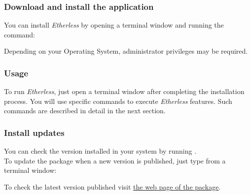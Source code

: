     \subsubsection{Download and install the application}
    You can install \textit{Etherless} by opening a terminal window and running the command:
     \begin{center}
     \end{center}
     Depending on your Operating System, administrator privileges may be required. \\
         \subsubsection{Usage}
      To run \textit{Etherless}, just open a terminal window after completing the installation process. You will use specific commands to execute \textit{Etherless} features. Such commands are described in detail in the next section.

     \subsubsection{Install updates}
     You can check the version installed in your system by running . \\
     To update the package when a new version is published, just type from a terminal window:
	\begin{center}
	\end{center}
	To check the latest version published visit \href{https://www.npmjs.com/package/@roundabout-team/etherless-cli}{the web page of the package}.
